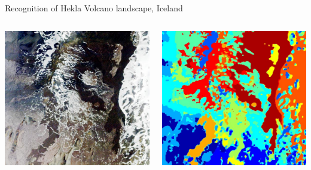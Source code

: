 \documentclass[pressentation,9pt,aspectratio=1610,xcolor=table]{beamer}
\begin{document}
\begin{frame}{Recognition of Hekla Volcano landscape, Iceland}

  \begin{columns}
    \begin{column}{0.45\columnwidth}
      \begin{center}
        \includegraphics[width=.8\linewidth]{hekla_original.jpg}
      \end{center}
    \end{column}
    \begin{column}{0.45\columnwidth}
      \begin{center}
        \includegraphics[width=.8\linewidth]{hekla_classif.jpg}
      \end{center}
    \end{column}
  \end{columns}


\end{frame}
\end{document}
